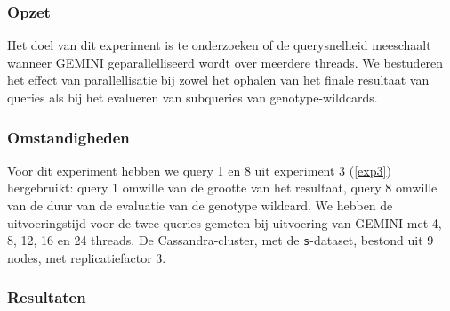 \subsubsection{Opzet}

Het doel van dit experiment is te onderzoeken of de querysnelheid meeschaalt wanneer GEMINI geparallelliseerd wordt over meerdere threads. We bestuderen het effect van parallellisatie bij zowel het ophalen van het finale resultaat van queries als bij het evalueren van subqueries van genotype-wildcards.

\subsubsection{Omstandigheden}

Voor dit experiment hebben we query 1 en 8 uit experiment 3 (\ref{exp3}) hergebruikt: query 1 omwille van de grootte van het resultaat, query 8 omwille van de duur van de evaluatie van de genotype wildcard. We hebben de uitvoeringstijd voor de twee queries gemeten bij uitvoering van GEMINI met 4, 8, 12, 16 en 24 threads. De Cassandra-cluster, met de \texttt{s}-dataset, bestond uit 9 nodes, met replicatiefactor 3.

\subsubsection{Resultaten}


